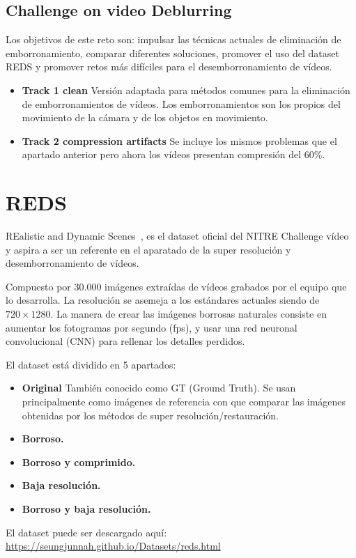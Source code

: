     \subsection {Challenge on video Deblurring ~\cite{NITRE_CVD}}
        Los objetivos de este reto son: impulsar las técnicas actuales de eliminación de emborronamiento, comparar diferentes soluciones, promover el uso del dataset REDS y promover retos más difíciles para el desemborronamiento de vídeos.  

        \begin{itemize}
        \item\textbf {Track 1 clean} Versión adaptada para métodos comunes para la eliminación de emborronamientos de vídeos. Los emborronamientos son los propios del movimiento de la cámara y de los objetos en movimiento.
        
        \item\textbf {Track 2 compression artifacts} Se incluye los mismos problemas que el apartado anterior pero ahora los vídeos presentan compresión del 60\%.
        \end{itemize}

\section{REDS}
    REalistic and Dynamic Scenes~\cite{Nah_2019_CVPR_Workshops_REDS}, es el dataset oficial del NITRE Challenge vídeo y aspira a ser un referente en el aparatado de la super resolución y desemborronamiento de vídeos.
    
    Compuesto por 30.000 imágenes extraídas de vídeos grabados por el equipo que lo desarrolla. La resolución se asemeja a los estándares actuales siendo de $720\times 1280$. La manera de crear las imágenes borrosas naturales consiste en aumentar los fotogramas por segundo (fps), y usar una red neuronal convolucional (CNN) para rellenar los detalles perdidos.
    
    El dataset está dividido en 5 apartados:
        \begin{itemize}
        \item\textbf {Original} También conocido como GT (Ground Truth). Se usan principalmente como imágenes de referencia con que comparar  las imágenes obtenidas por los métodos de super resolución/restauración.
        \item\textbf {Borroso.} 
        \item\textbf {Borroso y comprimido.} 
        \item\textbf {Baja resolución.} 
        \item\textbf {Borroso y baja resolución.} 
        \end{itemize}
    El dataset puede ser descargado aquí: \url{https://seungjunnah.github.io/Datasets/reds.html}

